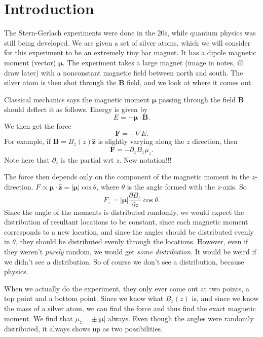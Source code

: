 \chapter{Introduction}

The Stern-Gerlach experiments were done in the 20s, while quantum physics was still being developed. We are given a set of silver atoms, which we will consider for this experiment to be an extremely tiny bar magnet. It has a dipole magnetic moment (vector) $\boldsymbol{\mu}  $. The experiment takes a large magnet (image in notes, ill draw later) with a nonconstant magnetic field between north and south. The silver atom is then shot through the $\mathbf{B}$ field, and we look at where it comes out.

Classical mechanics says the magnetic moment $\boldsymbol{\mu} $ passing through the field $\mathbf{B}$ should deflect it as follows. Energy is given by
\[
	E=-\boldsymbol{\mu} \cdot \mathbf{B}
.\]
We then get the force
\[
	\mathbf{F}=-\nabla E
.\]
For example, if $\mathbf{B}=B_z(z) \mathbf{\hat{z}}$ is slightly varying along the $z$ direction, then
\[
	\mathbf{F}=-\partial_z B_z \mu _z
.\]
Note here that $\partial_z$ is the partial wrt $z$. New notation!!!

The force then depends only on the component of the magnetic moment in the $z$-direction. $F\propto \boldsymbol{\mu} \cdot \mathbf{\hat{z}}=\left| \boldsymbol{\mu}   \right| \cos \theta $, where $\theta $ is the angle formed with the $z$-axis. So
\[
	F_z = \left| \boldsymbol{\mu}  \right| \frac{\partial B_z}{\partial z} \cos \theta 
.\]
Since the angle of the moments is distributed randomly, we would expect the distribution of resultant locations to be constant, since each magnetic moment corresponds to a new location, and since the angles should be distributed evenly in $\theta $, they should be distributed evenly through the locations. However, even if they weren't \emph{purely} random, we would get \emph{some distribution}. It would be weird if we didn't see a distribution. So of course we don't see a distribution, because physics.

When we actually do the experiment, they only ever come out at two points, a top point and a bottom point. Since we know what $B_z(z)$ is, and since we know the mass of a silver atom, we can find the force and thus find the exact magnetic moment. We find that $\mu_z = \pm \left| \boldsymbol{\mu}  \right| $ always. Even though the angles were randomly distributed, it always shows up as two possibilities.

